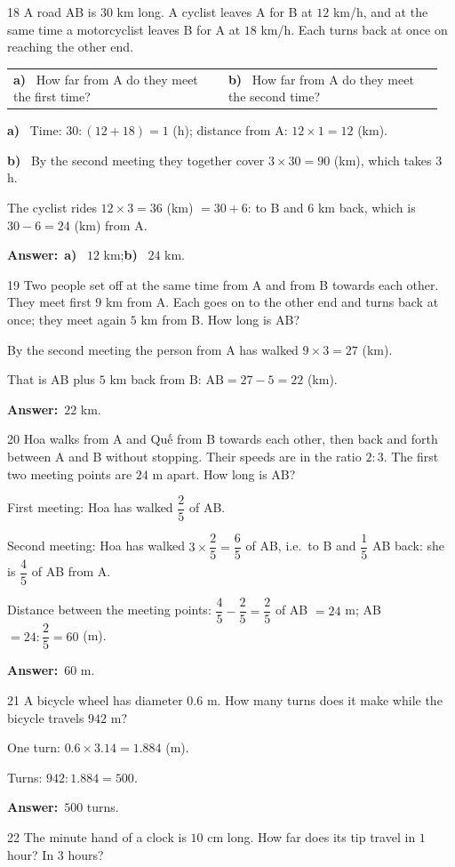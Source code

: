 \documentclass[11pt]{article}
\makeatletter
\newif\ifsol \solfalse
\renewcommand{\arraystretch}{1.35}
\providecommand{\AnsWord}{Đáp số}
\newcommand{\dapso}[1]{\par\textbf{\AnsWord:}\ #1}
\newcommand{\probsol}[1]{%
  \begin{lrbox}{\solmeasure}\begin{minipage}{\dimexpr\linewidth-24pt\relax}#1\end{minipage}\end{lrbox}%
  \ifsol
    \begin{solbox}#1\end{solbox}%
  \else
    \setlength{\solht}{\dimexpr\ht\solmeasure+\dp\solmeasure+0.85cm\relax}%
    \ifdim\solht<1.35cm\setlength{\solht}{1.35cm}\fi
    \begin{tcolorbox}[colback=white,colframe=Line,boxrule=0.8pt,arc=5pt,
      left=8pt,right=8pt,top=4pt,bottom=4pt,height=\solht]{\footnotesize\color{Slate}\itshape\WorkWord}\end{tcolorbox}%
  \fi}
\newcommand{\pa}[1]{\textbf{#1)}\ }
\newenvironment{cols2}{\par\vspace{3pt}\noindent\setlength{\tabcolsep}{0pt}\renewcommand{\arraystretch}{1.3}%
  \begin{tabular}{@{}>{\raggedright\arraybackslash\rule{0pt}{4.4ex}}p{0.48\linewidth}<{\rule[-2.3ex]{0pt}{0pt}}@{\hspace{0.03\linewidth}}>{\raggedright\arraybackslash\rule{0pt}{4.4ex}}p{0.48\linewidth}<{\rule[-2.3ex]{0pt}{0pt}}@{}}}%
  {\end{tabular}\par}
\newcommand{\gap}{\vspace{0.3cm}}
\def\WorkWord{Your work:}
\def\AnsWord{Answer}
\makeatother
\begin{document}
\gap
\begin{probbox}{18}{\relax}
A road AB is $30$ km long. A cyclist leaves A for B at $12$ km/h, and at the same time a motorcyclist leaves B for A at $18$ km/h. Each turns back at once on reaching the other end.
\begin{cols2}
\pa{a} How far from A do they meet the first time? & \pa{b} How far from A do they meet the second time?
\end{cols2}
\end{probbox}
\probsol{
\pa{a} Time: $30:(12+18)=1$ (h); distance from A: $12\times1=12$ (km).\par
\pa{b} By the second meeting they together cover $3\times30=90$ (km), which takes $3$ h.\par
The cyclist rides $12\times3=36$ (km) $=30+6$: to B and $6$ km back, which is $30-6=24$ (km) from A.
\dapso{\pa{a} $12$ km;\quad \pa{b} $24$ km.}}
\gap
\begin{probbox}{19}{\relax}
Two people set off at the same time from A and from B towards each other. They meet first $9$ km from A. Each goes on to the other end and turns back at once; they meet again $5$ km from B. How long is AB?
\end{probbox}
\probsol{
By the second meeting the person from A has walked $9\times3=27$ (km).\par
That is AB plus $5$ km back from B: $\text{AB}=27-5=22$ (km).
\dapso{$22$ km.}}
\gap
\begin{probbox}{20}{\relax}
Hoa walks from A and Quế from B towards each other, then back and forth between A and B without stopping. Their speeds are in the ratio $2:3$. The first two meeting points are $24$ m apart. How long is AB?
\end{probbox}
\probsol{
First meeting: Hoa has walked $\dfrac25$ of AB.\par
Second meeting: Hoa has walked $3\times\dfrac25=\dfrac65$ of AB, i.e.\ to B and $\dfrac15$ AB back: she is $\dfrac45$ of AB from A.\par
Distance between the meeting points: $\dfrac45-\dfrac25=\dfrac25$ of AB $=24$ m; AB $=24:\dfrac25=60$ (m).
\dapso{$60$ m.}}
\gap
\begin{probbox}{21}{\relax}
A bicycle wheel has diameter $0.6$ m. How many turns does it make while the bicycle travels $942$ m?
\end{probbox}
\probsol{
One turn: $0.6\times3.14=1.884$ (m).\par Turns: $942:1.884=500$.
\dapso{$500$ turns.}}
\gap
\begin{probbox}{22}{\relax}
The minute hand of a clock is $10$ cm long. How far does its tip travel in $1$ hour? In $3$ hours?
\end{probbox}
\end{document}
